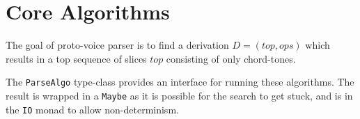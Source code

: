 \documentclass[12pt,a4paper,twoside,openany]{report} \usepackage[pdfborder={0 0 0}]{hyperref}    %
\theoremstyle{definition} \newtheorem{definition}{Definition}[section]
\begin{document}
%
%
%
%
%
%
%

\section{Core Algorithms} 
\label{sec:baselineAlgorithms}

The goal of proto-voice parser is to find a derivation $D= (top, ops)$ which results in
a top sequence of slices $top$ consisting of only chord-tones. 

The \texttt{ParseAlgo} type-class provides an interface for running these algorithms. The result is wrapped in
a \texttt{Maybe} as it is possible for the search to get stuck, and is in the \texttt{IO} monad to allow
non-determinism.
\end{document}
